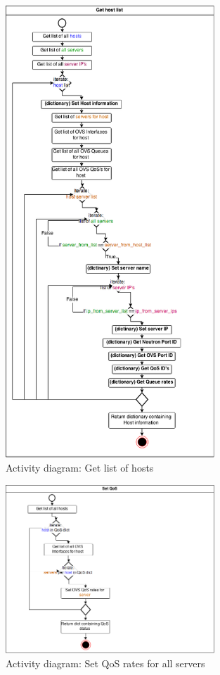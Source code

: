\begin{figure}[H]
\centering

\includegraphics[width=0.7\textwidth]{images/design/activity_host_list}

\caption{Activity diagram: Get list of hosts}
\end{figure}

\begin{figure}[H]
\centering

\includegraphics[width=0.7\textwidth]{images/design/activity_set_qos}

\caption{Activity diagram: Set QoS rates for all servers}
\end{figure}

